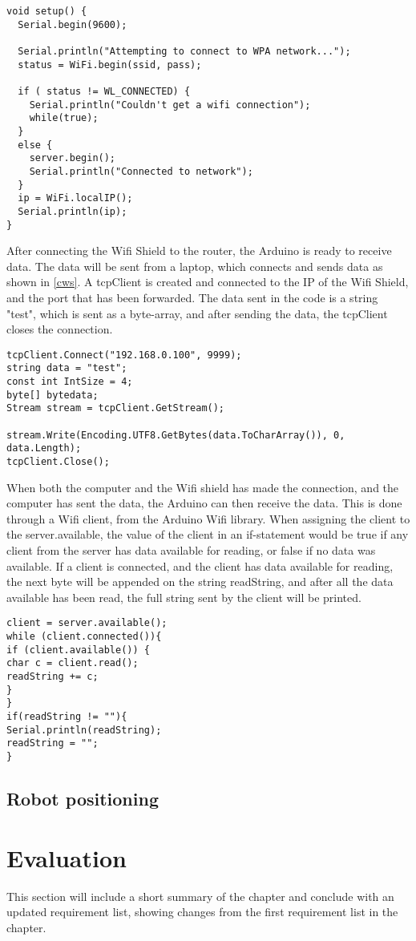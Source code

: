 \begin{lstlisting}[caption={Connecting the Wifi shield to the network}, label={ws}]
void setup() {
  Serial.begin(9600);

  Serial.println("Attempting to connect to WPA network...");
  status = WiFi.begin(ssid, pass);

  if ( status != WL_CONNECTED) { 
    Serial.println("Couldn't get a wifi connection");
    while(true);
  } 
  else {
    server.begin();
    Serial.println("Connected to network");
  }
  ip = WiFi.localIP();
  Serial.println(ip);
}
\end{lstlisting}

After connecting the Wifi Shield to the router, the Arduino is ready to receive data. The data will be sent from a laptop, which connects and sends data as shown in \ref{cws}. A tcpClient is created and connected to the IP of the Wifi Shield, and the port that has been forwarded. The data sent in the code is a string "test", which is sent as a byte-array, and after sending the data, the tcpClient closes the connection.

\begin{lstlisting}[caption={Connecting the computer to the Wifi Shield}, label={cws}]
tcpClient.Connect("192.168.0.100", 9999);
string data = "test";
const int IntSize = 4;
byte[] bytedata;
Stream stream = tcpClient.GetStream();

stream.Write(Encoding.UTF8.GetBytes(data.ToCharArray()), 0, data.Length);
tcpClient.Close();
\end{lstlisting}

When both the computer and the Wifi shield has made the connection, and the computer has sent the data, the Arduino can then receive the data. This is done through a Wifi client, from the Arduino Wifi library. When assigning the client to the server.available, the value of the client in an if-statement would be true if any client from the server has data available for reading, or false if no data was available. If a client is connected, and the client has data available for reading, the next byte will be appended on the string readString, and after all the data available has been read, the full string sent by the client will be printed.

\begin{lstlisting}[caption={Receiving data from the computer}, label={rdc}]
client = server.available();
while (client.connected()){
if (client.available()) {
char c = client.read(); 
readString += c;
}
}
if(readString != ""){
Serial.println(readString);
readString = "";
}
\end{lstlisting}

\subsection{Robot positioning}
\label{sec:Robot positioning Implementation}

\section{Evaluation}
\label{sec:i2Evaluation}
This section will include a short summary of the chapter and conclude with an updated requirement list, showing changes from the first requirement list in the chapter. 